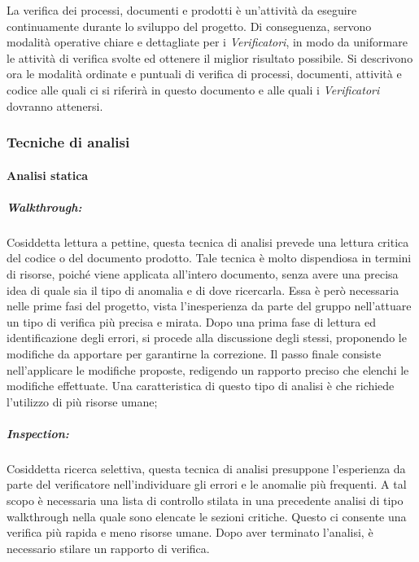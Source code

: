 La verifica dei processi, documenti e prodotti è un'attività da eseguire continuamente durante lo sviluppo del progetto. Di conseguenza, servono modalità operative chiare e dettagliate per i \textit{Verificatori}, in modo da uniformare le attività di verifica svolte ed ottenere il miglior risultato possibile. Si descrivono ora le modalità ordinate e puntuali di verifica di processi, documenti, attività e codice alle quali ci si riferirà in questo documento e alle quali i \textit{Verificatori} dovranno attenersi.

\subsubsection{Tecniche di analisi}

	\paragraph{Analisi statica}
		\subparagraph{Walkthrough:}
Cosiddetta lettura a pettine, questa tecnica di analisi prevede una lettura critica del codice o del documento prodotto. Tale tecnica è molto dispendiosa in termini di risorse, poiché viene applicata all'intero documento, senza avere una precisa idea di quale sia il tipo di anomalia e di dove ricercarla. Essa è però necessaria nelle prime fasi del progetto, vista l'inesperienza da parte del gruppo nell'attuare un tipo di verifica più precisa e mirata. Dopo una prima fase di lettura ed identificazione degli errori, si procede alla discussione degli stessi, proponendo le modifiche da apportare per garantirne la correzione. Il passo finale consiste nell'applicare le modifiche proposte, redigendo un rapporto preciso che elenchi le modifiche effettuate. Una caratteristica di questo tipo di analisi è che richiede l'utilizzo di più risorse umane;
	\subparagraph{Inspection:}
Cosiddetta ricerca selettiva, questa tecnica di analisi presuppone l'esperienza da parte del verificatore nell'individuare gli errori e le anomalie più frequenti. A tal scopo è necessaria una lista di controllo stilata in una precedente analisi di tipo \gls{walkthrough} nella quale sono elencate le sezioni critiche. Questo ci consente una verifica più rapida e meno risorse umane. Dopo aver terminato l'analisi, è necessario stilare un rapporto di verifica.


